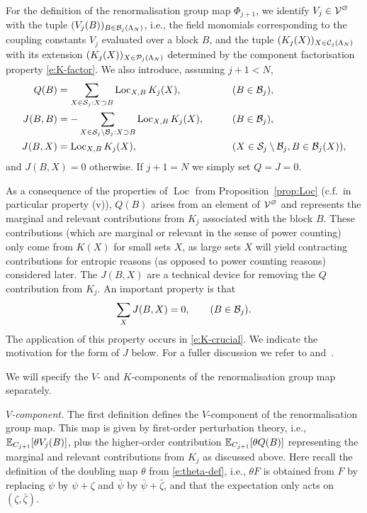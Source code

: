 \documentclass[11pt]{amsart}
\numberwithin{equation}{section}
\numberwithin{theorem}{section}
\newcommand{\1}{{\bf 1}}
\newcommand{\cVbulk}{\cV^\varnothing}
\newcommand{\Loc}{\operatorname{Loc}}
\begin{document}
For the definition of the renormalisation group map $\Phi_{j+1}$,
we identify $V_j \in \cVbulk$ with the tuple $(V_j(B))_{B \in \mathcal B_j(\Lambda_N)}$,
i.e., the field monomials corresponding to the coupling constants $V_j$ evaluated over a block $B$,
and the tuple $(K_j(X))_{X\in \mathcal C_j(\Lambda_N)}$ with its extension $(K_j(X))_{X\in\mathcal P_j(\Lambda_N)}$
determined by the component factorisation property \eqref{e:K-factor}.
We also introduce, assuming $j+1<N$,
\begin{align} \label{e:Q-def}
  Q(B) &= \sum_{X\in \cS_j: X \supset B} \Loc_{X,B} 
         K_j(X), &\qquad& (B \in \cB_j),  \\
  \label{e:J-defB}
  J(B,B) &= - \sum_{X\in \cS_j \setminus \cB_j: X \supset B} \Loc_{X,B} 
           K_j(X), &\qquad& (B \in \cB_j),\\
  \label{e:J-def}
  J(B,X) &= \Loc_{X,B} 
           K_j(X), &\qquad& (X \in \cS_j \setminus \cB_j, B \in \cB_j(X)),
\end{align}
and $J(B,X)=0$ otherwise. If $j+1=N$ we simply set $Q=J=0$.

As a consequence of the properties of $\Loc$ from
Proposition~\ref{prop:Loc} (c.f.~in particular property (v)), $Q(B)$
arises from an element of $\cVbulk$ and represents the marginal and
relevant contributions from $K_j$ associated with the block $B$.
These contributions (which are marginal or relevant in the sense of
power counting) only come
from $K(X)$ for small sets $X$, as large
sets $X$ will yield contracting contributions for entropic reasons
(as opposed to power counting reasons) considered later. The
$J(B,X)$ are a technical device for removing the $Q$ contribution
from $K_j$.  An important property is that
\begin{equation} \label{e:J-zero}
  \sum_X J(B,X) = 0, \qquad (B \in \mathcal B_j).
\end{equation}
The application of this property occurs in \eqref{e:K-crucial}.
We indicate the motivation for the form of $J$ below. For a fuller
discussion we refer to \cite[Lectures~4--5]{MR2523458} and~\cite[Appendix~A, 12.3.2]{rg-brief}.

\medskip
We will specify the $V$- and $K$-components of the renormalisation group map separately.

\medskip
\noindent
\emph{$V$-component.}
The first definition defines the $V$-component of the renormalisation group map.
This map is given by first-order perturbation theory, i.e., $\mathbb{E}_{C_{j+1}}[\theta V_j(B)]$,
plus the higher-order contribution $\mathbb{E}_{C_{j+1}}[\theta Q(B)]$ representing the marginal and relevant
contributions from $K_j$ as discussed above.
Here recall the definition of the doubling map $\theta$ from \eqref{e:theta-def}, i.e.,
$\theta F$ is obtained from $F$ by replacing $\psi$ by $\psi+\zeta$ and $\bar\psi$ by $\bar\psi+\bar\zeta$,
and that the expectation only acts on $(\zeta,\bar\zeta)$.
\end{document}
